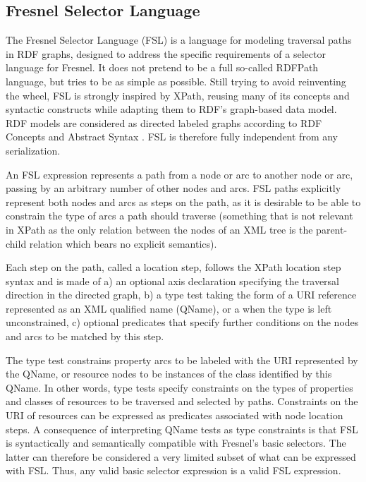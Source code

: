 \subsection{Fresnel Selector Language}

The Fresnel Selector Language (FSL) is a language for modeling traversal paths in RDF graphs, designed to address the specific requirements of a selector language for Fresnel. It does not pretend to be a full so-called RDFPath language, but tries to be as simple as possible. Still trying to avoid reinventing the wheel, FSL is strongly inspired by XPath, reusing many of its concepts and syntactic constructs while adapting them to RDF's graph-based data model. RDF models are considered as directed labeled graphs according to RDF Concepts and Abstract Syntax \cite{rdfcas04}. FSL is therefore fully independent from any serialization.

An FSL expression represents a path from a node or arc to another node or arc, passing by an arbitrary number of other nodes and arcs. FSL paths explicitly represent both nodes and arcs as steps on the path, as it is desirable to be able to constrain the type of arcs a path should traverse (something that is not relevant in XPath as the only relation between the nodes of an XML tree is the parent-child relation which bears no explicit semantics).

Each step on the path, called a location step, follows the XPath location step syntax and is made of a) an optional axis declaration specifying the traversal direction in the directed graph, b) a type test taking the form of a URI reference represented as an XML qualified name (QName), or a \rdf{*} when the type is left unconstrained, c) optional predicates that specify further conditions on the nodes and arcs to be matched by this step.

The type test constrains property arcs to be labeled with the URI represented by the QName, or resource nodes to be instances of the class identified by this QName. In other words, type tests specify constraints on the types of properties and classes of resources to be traversed and selected by paths. Constraints on the URI of resources can be expressed as predicates associated with node location steps. A consequence of interpreting QName tests as type constraints is that FSL is syntactically and semantically compatible with Fresnel's basic selectors. The latter can therefore be considered a very limited subset of what can be expressed with FSL. Thus, any valid basic selector expression is a valid FSL expression.

